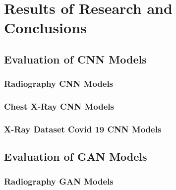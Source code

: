 \chapter{Results of Research and Conclusions}
\section{Evaluation of CNN Models}
\subsection{Radiography CNN Models}
\subsection{Chest X-Ray CNN Models}
\subsection{X-Ray Dataset Covid 19 CNN Models}
\section{Evaluation of GAN Models}
\subsection{Radiography GAN Models}
